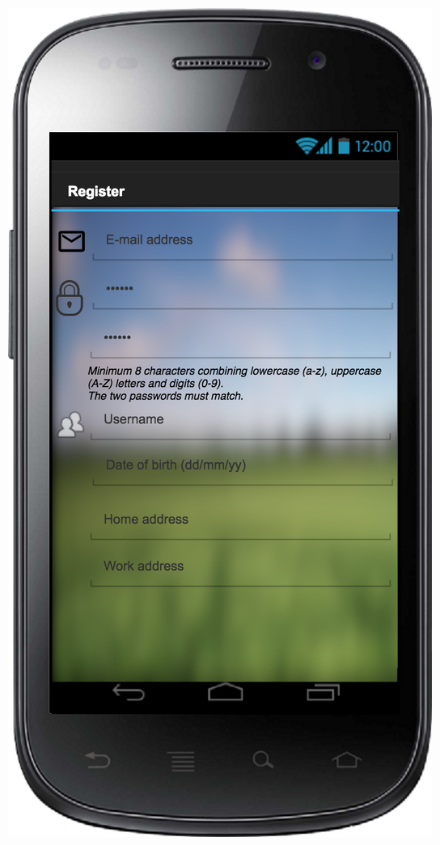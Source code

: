 \documentclass[a4paper,leqno]{article}
\begin{document}
\begin{figure}
\hspace{0.5cm}
\begin{minipage}[!h]{0.45\linewidth}
	\centering
	\includegraphics[scale = 0.15]{Registration.png}
\end{minipage}
\end{figure}
\end{document}
